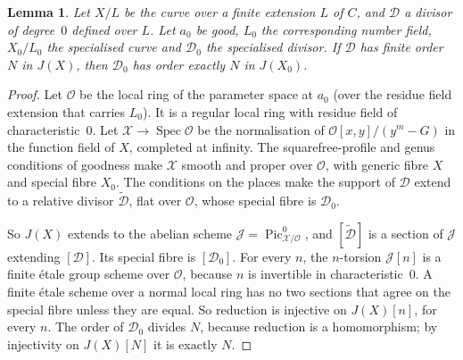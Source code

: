 \documentclass[11pt]{article}
\newtheorem{lemma}[theorem]{Lemma}
\theoremstyle{definition}
\theoremstyle{remark}
\begin{document}
\begin{lemma}\label{lem:E44inj}
Let $X/L$ be the curve over a finite extension $L$ of $C$, and $\mathcal D$ a divisor
of degree~$0$ defined over $L$. Let $a_0$ be good, $L_0$ the corresponding number
field, $X_0/L_0$ the specialised curve and $\mathcal D_0$ the specialised divisor. If
$\mathcal D$ has finite order $N$ in $J(X)$, then $\mathcal D_0$ has order exactly $N$
in $J(X_0)$.
\end{lemma}
\begin{proof}
Let $\mathcal O$ be the local ring of the parameter space at $a_0$ (over the residue
field extension that carries $L_0$). It is a regular local ring with residue field of
characteristic~$0$. Let $\mathcal X\to\operatorname{Spec}\mathcal O$ be the
normalisation of $\mathcal O[x,y]/(y^m-G)$ in the function field of $X$, completed at
infinity. The squarefree-profile and genus conditions of goodness make $\mathcal X$
smooth and proper over $\mathcal O$, with generic fibre $X$ and special fibre $X_0$. The
conditions on the places make the support of $\mathcal D$ extend to a relative divisor
$\widetilde{\mathcal D}$, flat over $\mathcal O$, whose special fibre is $\mathcal D_0$.

So $J(X)$ extends to the abelian scheme $\mathcal J=\operatorname{Pic}^0_{\mathcal
X/\mathcal O}$, and $[\widetilde{\mathcal D}]$ is a section of $\mathcal J$ extending
$[\mathcal D]$. Its special fibre is $[\mathcal D_0]$. For every $n$, the $n$-torsion
$\mathcal J[n]$ is a finite \'etale group scheme over $\mathcal O$, because $n$ is
invertible in characteristic~$0$. A finite \'etale scheme over a normal local ring has
no two sections that agree on the special fibre unless they are equal. So reduction is
injective on $J(X)[n]$, for every $n$. The order of $\mathcal D_0$ divides $N$,
because reduction is a homomorphism; by injectivity on $J(X)[N]$ it is exactly $N$.
\end{proof}
\end{document}
